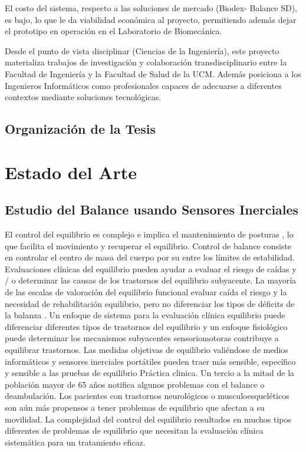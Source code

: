 \documentclass[12pt,a4paper]{article}
\begin{document}
			El costo del sistema, respecto a las soluciones de mercado (Biodex- Balance SD), es bajo, lo que le da viabilidad económica al proyecto, permitiendo además dejar el prototipo en operación en el Laboratorio de Biomecánica. 
			
			Desde el punto de vista disciplinar (Ciencias de la Ingeniería), este proyecto materializa trabajos de investigación y colaboración transdisciplinario entre la Facultad de Ingeniería y la Facultad de Salud de la UCM. Además posiciona a los Ingenieros Informáticos como profesionales capaces de adecuarse a diferentes contextos mediante soluciones tecnológicas.
			\subsection{Organizaci\'on de la Tesis}
			
			
			
			\section{Estado del Arte}
			\subsection{Estudio del Balance usando Sensores Inerciales}
			El control del equilibrio es complejo e implica el mantenimiento de posturas \cite{mancini_relevance_2010}, lo que facilita el movimiento y recuperar el equilibrio. Control de balance consiste en controlar el centro de masa del cuerpo  por su entre los límites de estabilidad. Evaluaciones clínicas del equilibrio pueden ayudar a evaluar el riesgo de caídas y / o determinar las causas de los trastornos del equilibrio subyacente. 
			La mayoría de las escalas de valoración del equilibrio funcional evaluar caída
			el riesgo y la necesidad de rehabilitación equilibrio, pero no diferenciar los tipos de déficits de la balanza . Un enfoque de sistema para la evaluación clínica equilibrio puede diferenciar diferentes tipos de trastornos del equilibrio y un enfoque fisiológico puede determinar los mecanismos subyacentes sensoriomotoras contribuye a equilibrar trastornos. Las medidas objetivas de equilibrio valiéndose de medios informáticos y sensores inerciales portátiles pueden traer más sensible, específico y sensible a las pruebas de equilibrio Práctica clinica.
			Un tercio a la mitad de la población mayor de 65 años notifica algunos problemas con el balance o
			deambulación. Los pacientes con trastornos neurológicos o musculoesqueléticos son aún más propensos a tener problemas de equilibrio que afectan a su movilidad. La complejidad del control del equilibrio resultados en muchos tipos diferentes de problemas de equilibrio que necesitan la evaluación clínica sistemática para un tratamiento eficaz.
			
\end{document}
